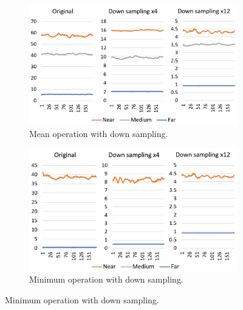 \documentclass[10pt,a4paper,twocolumn,twoside]{article}
\begin{document}
	\begin{figure}
		\centering
		\begin{subfigure}[t]{0.5\textwidth}
			\centering
			\includegraphics[width=\linewidth]{img/mean2.png}
			\caption{Mean operation with down sampling.\newline}
			\label{fig:output:mean}
		\end{subfigure}
	
		\begin{subfigure}[t]{0.5\textwidth}
			\centering
			\includegraphics[width=\linewidth]{img/min2.png}
			\caption{Minimum operation with down sampling.\newline}
			\label{fig:output:min}
		\end{subfigure}


\end{figure}
\end{document}
